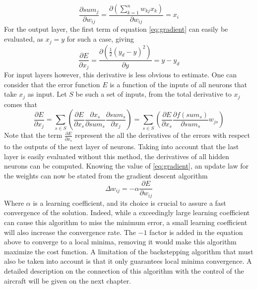 \begin{equation}
\frac{\partial sum_j}{\partial w_{ij}} = \frac{\partial \left(\sum ^n_{k=1} w_{kj} x_k\right)}{\partial w_{ij}} = x_i
\end{equation}
For the output layer, the first term of equation \ref{eq:gradient} can easily be evaluated, as $x_j=y$ for such a case, giving
\begin{equation}
\frac{\partial E}{\partial x_j}=\frac{\partial (\frac{1}{2} (y_d-y)^2)}{\partial y}= y-y_d
\end{equation}
For input layers however, this derivative is less obvious to estimate. One can consider that the error function $E$ is a function of the inputs of all neurons that take $x_j$ as input. Let $S$ be such a set of inputs, from the total derivative to $x_j$ comes that
\begin{equation}
\frac{\partial E}{\partial x_j} = \sum _{s\in S}\left( \frac{\partial E}{\partial x_s}\frac{\partial x_s}{\partial sum_s}\frac{\partial sum_s}{\partial x_j}\right)=\sum _{s\in S}\left( \frac{\partial E}{\partial x_s}\frac{\partial f(sum_s)}{\partial sum_s}w_{js}\right)
\end{equation}
Note that the term $ \frac{\partial E}{\partial x_s} $ represent the all the derivatives of the errors with respect to the outputs of the next layer of neurons. Taking into account that the last layer is easily evaluated without this method, the derivatives of all hidden neurons can be computed. Knowing the value of \ref{eq:gradient}, an update law for the weights can now be stated from the gradient descent algorithm
\begin{equation}\label{eq:update_law}
\Delta w_{ij} = - \alpha \frac{\partial E}{\partial w_{ij}}
\end{equation}
Where $\alpha$ is a learning coefficient, and its choice is crucial to assure a fast convergence of the solution. Indeed, while a exceedingly large learning coefficient can cause this algorithm to miss the minimum error, a small learning coefficient will also increase the convergence rate. The $-1$ factor is added in the equation above to converge to a local minima, removing it would make this algorithm maximize the cost function. A limitation of the backstepping algorithm that must also be taken into account is that it only guarantees local minima convergence. 
A detailed description on the connection of this algorithm with the control of the aircraft will be given on the next chapter.
